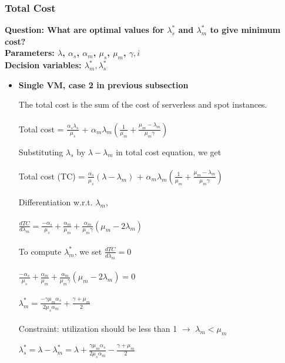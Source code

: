 \documentclass[letter,11pt]{article}
\begin{document}
\subsubsection{Total Cost} 

\textbf{Question: What are optimal values for $\lambda_s^{*}$ and $\lambda_m^{*}$ to give minimum cost?} \\
\textbf{Parameters: $\lambda$, $\alpha_s$, $\alpha_m$, $\mu_s$, $\mu_m$, $\gamma, i$} \\
\textbf{Decision variables: $\lambda_m^{*}, \lambda_s^{*}$} \\

\begin{itemize}
\item \textbf{Single VM, case 2 in previous subsection}

The total cost is the sum of the cost of serverless and spot instances. \\ \\
Total cost = $\frac{\alpha_s \lambda_s}{\mu_s}$ + $\alpha_m \lambda_m(\frac{1}{\mu_m} + \frac{\mu_m - \lambda_m}{\mu_m \gamma}) $

Substituting $\lambda_s$ by $\lambda - \lambda_m$ in total cost equation, we get\\ \\
Total cost (TC) = $\frac{\alpha_s}{\mu_s}(\lambda - \lambda_m)$ + $\alpha_m \lambda_m(\frac{1}{\mu_m} + \frac{\mu_m - \lambda_m}{\mu_m \gamma}) $ \\ \\
Differentiation w.r.t. $\lambda_m$, \\ \\
$\frac{d TC}{d \lambda_m} = \frac{- \alpha_s}{\mu_s} + \frac{\alpha_m}{\mu_m} + \frac{\alpha_m}{\mu_m \gamma}(\mu_m - 2 \lambda_m)$ \\ \\
To compute $\lambda_m^{*}$, we set $\frac{d TC}{d \lambda_m} = 0$ \\ \\
$\frac{- \alpha_s}{\mu_s} + \frac{\alpha_m}{\mu_m} + \frac{\alpha_m}{\mu_m \gamma}(\mu_m - 2 \lambda_m) = 0$ \\ \\ 
$\lambda_m^{*} = \frac{- \gamma \mu_m \alpha_s}{2 \mu_s \alpha_m} + \frac{\gamma + \mu_m}{2}$ \\ \\
Constraint: utilization should be less than 1 $\rightarrow$ $\lambda_m < \mu_m$

$\lambda_s^{*} = \lambda - \lambda_m^{*} = \lambda + \frac{\gamma \mu_m \alpha_s}{2 \mu_s \alpha_m} - \frac{\gamma + \mu_m}{2}$


\end{itemize}
\end{document}
